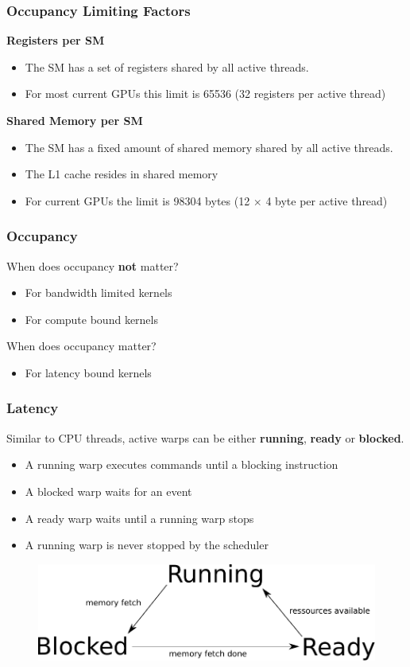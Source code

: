 \documentclass[aspectratio=169,handout]{beamer}
\begin{document}
\begin{frame}[fragile]
\frametitle{Occupancy Limiting Factors}
\textbf{Registers per SM}
\begin{itemize}
	\item The SM has a set of registers shared by all active threads.
	\item For most current GPUs this limit is 65536 (32 registers per active thread)
\end{itemize}

\textbf{Shared Memory per SM}
\begin{itemize}
	\item The SM has a fixed amount of shared memory shared by all active threads. 
	\item The L1 cache resides in shared memory
	\item For current GPUs the limit is 98304 bytes (12 $\times$ 4 byte per active thread)
\end{itemize}		
\end{frame}


\begin{frame}[fragile]
\frametitle{Occupancy}
When does occupancy \textbf{not} matter?
\begin{itemize}
	\item For bandwidth limited kernels
	\item For compute bound kernels
\end{itemize}

When does occupancy matter?
\begin{itemize}
	\item For latency bound kernels
\end{itemize}		
\end{frame}



\begin{frame}[fragile]
\frametitle{Latency}

Similar to CPU threads, active warps can be either \textbf{running}, \textbf{ready} or \textbf{blocked}.
\begin{itemize}
	\item A running warp executes commands until a blocking instruction
	\item A blocked warp waits for an event
	\item A ready warp waits until a running warp stops 
	\item A running warp is never stopped by the scheduler
\end{itemize}

	\begin{figure}
	\centering
	\includegraphics[height=0.3\textheight]{latency}
\end{figure}
\end{frame}
\end{document}
